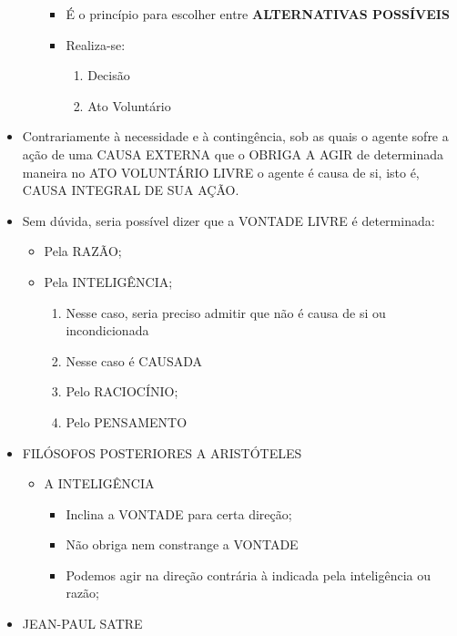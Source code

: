 \documentclass[
]{book}
\providecommand{\tightlist}{%
  \setlength{\itemsep}{0pt}\setlength{\parskip}{0pt}}
\begin{document}
\begin{itemize}
\begin{itemize}
    \begin{itemize}
    \tightlist
    \item
      É o princípio para escolher entre \textbf{ALTERNATIVAS POSSÍVEIS}
    \item
      Realiza-se:

      \begin{enumerate}
      \def\labelenumi{\alph{enumi}.}
      \tightlist
      \item
        Decisão
      \item
        Ato Voluntário
      \end{enumerate}
    \end{itemize}
  \end{itemize}
\item
  Contrariamente à necessidade e à contingência, sob as quais o agente sofre a ação de uma CAUSA EXTERNA que o OBRIGA A AGIR de determinada maneira no ATO VOLUNTÁRIO LIVRE o agente é causa de si, isto é, CAUSA INTEGRAL DE SUA AÇÃO.
\item
  Sem dúvida, seria possível dizer que a VONTADE LIVRE é determinada:

  \begin{itemize}
  \tightlist
  \item
    Pela RAZÃO;
  \item
    Pela INTELIGÊNCIA;

    \begin{enumerate}
    \def\labelenumi{\alph{enumi}.}
    \tightlist
    \item
      Nesse caso, seria preciso admitir que não é causa de si ou incondicionada
    \item
      Nesse caso é CAUSADA
    \item
      Pelo RACIOCÍNIO;
    \item
      Pelo PENSAMENTO
    \end{enumerate}
  \end{itemize}
\item
  FILÓSOFOS POSTERIORES A ARISTÓTELES

  \begin{itemize}
  \tightlist
  \item
    A INTELIGÊNCIA

    \begin{itemize}
    \tightlist
    \item
      Inclina a VONTADE para certa direção;
    \item
      Não obriga nem constrange a VONTADE
    \item
      Podemos agir na direção contrária à indicada pela inteligência ou razão;
    \end{itemize}
  \end{itemize}
\item
  JEAN-PAUL SATRE


\end{itemize}
\end{document}
